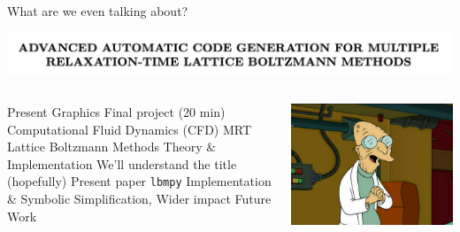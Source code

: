 \begin{frame}{What are we even talking about?}
  \begin{center}
    \includegraphics[width=0.8\linewidth]{title_header.png}
  \end{center}
  \begin{columns}
  \begin{outline}
    \1 Present Graphics Final project (20 min)
    \2 Computational Fluid Dynamics (CFD)
    \2 MRT Lattice Boltzmann Methods
    \2 Theory \& Implementation
    \2 We'll understand the title (hopefully) 
    \1 Present paper
      \2 \lstinline{lbmpy}
      \2 Implementation \& Symbolic Simplification, 
      \2 Wider impact
    \1 Future Work
  \end{outline}

  \centering
  \begin{center}
    \includegraphics[width=\linewidth]{professor.png}
  \end{center}
  \end{columns}
\end{frame}
